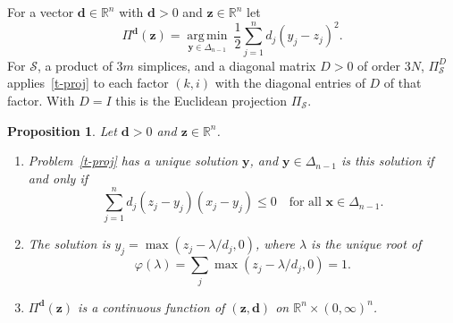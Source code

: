 \documentclass[11pt]{article}
\theoremstyle{plain}
\newtheorem{proposition}[theorem]{Proposition}
\theoremstyle{remark}
\numberwithin{equation}{section}
\begin{document}
For a vector $\bm d\in\mathbb{R}^n$ with $\bm d>0$ and $\bm z\in\mathbb{R}^n$ let
\begin{equation}\label{t-proj}
\Pi^{\bm d}(\bm z)=\operatorname*{arg\,min}_{\bm y\in\Delta_{n-1}}\
\frac12\sum_{j=1}^n d_j\left(y_j-z_j\right)^2 .
\end{equation}
For $\mathcal{S}$, a product of $3m$ simplices, and a diagonal matrix $D>0$
of order $3N$, $\Pi^D_{\mathcal{S}}$ applies~\eqref{t-proj} to each factor
$(k,i)$ with the diagonal entries of $D$ of that factor. With $D=I$ this is
the Euclidean projection $\Pi_{\mathcal{S}}$.

\begin{proposition}\label{t-proj-prop}
Let $\bm d>0$ and $\bm z\in\mathbb{R}^n$.
\begin{enumerate}
\item[(a)] Problem~\eqref{t-proj} has a unique solution $\bm y$, and
$\bm y\in\Delta_{n-1}$ is this solution if and only if
\begin{equation}\label{t-vi}
\sum_{j=1}^n d_j\left(z_j-y_j\right)\left(x_j-y_j\right)\le 0
\quad\text{for all }\bm x\in\Delta_{n-1}.
\end{equation}
\item[(b)] The solution is $y_j=\max\left(z_j-\lambda/d_j,0\right)$, where
$\lambda$ is the unique root of
\begin{equation*}
\varphi(\lambda)=\sum_j\max\left(z_j-\lambda/d_j,0\right)=1 .
\end{equation*}
\item[(c)] $\Pi^{\bm d}(\bm z)$ is a continuous function of $(\bm z,\bm d)$
on $\mathbb{R}^n\times(0,\infty)^n$.
\end{enumerate}
\end{proposition}
\end{document}
